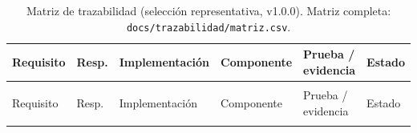 \begin{landscape}
\small
\begin{longtable}{@{}
  >{\raggedright\arraybackslash}p{2.0cm}
  >{\raggedright\arraybackslash}p{1.8cm}
  >{\raggedright\arraybackslash}p{5.4cm}
  >{\raggedright\arraybackslash}p{4.6cm}
  >{\raggedright\arraybackslash}p{6.1cm}
  >{\raggedright\arraybackslash}p{2.5cm}
@{}}
\caption{Matriz de trazabilidad (selecci\'on representativa, v1.0.0). Matriz completa: \texttt{docs/trazabilidad/matriz.csv}.}
\label{tab:trazabilidad-final} \\
\toprule
Requisito & Resp. & Implementaci\'on & Componente & Prueba / evidencia & Estado \\
\midrule
\endfirsthead
\multicolumn{6}{c}{\tablename\ \thetable\ -- continuaci\'on} \\
\toprule
Requisito & Resp. & Implementaci\'on & Componente & Prueba / evidencia & Estado \\
\midrule
\endhead
\bottomrule
\endfoot


\end{longtable}
\end{landscape}
